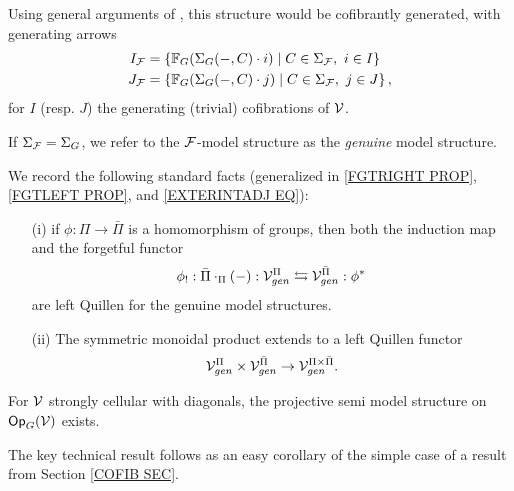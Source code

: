 \documentclass[a4paper,10pt]{article}%
\begin{document}
Using general arguments of \cite{SS00}, this structure would be cofibrantly generated, with generating arrows 
\begin{align*} 
  I_{\mathcal F} &= \left\{ \mathbb F_G(\Sigma_G(-,C) \cdot i) \;|\; C \in \Sigma_{\mathcal F},\ i\in I\right\}\\ 
  J_{\mathcal F} &= \left\{ \mathbb F_G(\Sigma_G(-,C) \cdot j) \;|\; C \in \Sigma_{\mathcal F},\ j\in J\right\}, 
\end{align*} 
for $I$ (resp. $J$) the generating (trivial) cofibrations of $\mathcal V$. 

\begin{notation} 
  If $\Sigma_{\mathcal F} = \Sigma_G$, we refer to the $\mathcal F$-model structure as the \textit{genuine} model structure. 
\end{notation} 

\begin{remark}
        \label{GENUINE_FGTRIGHT_REMARK} 
  We record the following standard facts (generalized in \ref{FGTRIGHT PROP}, \ref{FGTLEFT PROP}, and \ref{EXTERINTADJ EQ}):
  \begin{itemize}
  \item [(i)] if $\phi: \Pi \to \bar \Pi$ is a homomorphism of groups, then both the induction map and the forgetful functor 
  \[ 
  \phi_!: \bar\Pi\cdot_\Pi(-): \mathcal V^\Pi_{gen} \leftrightarrows \mathcal V^{\bar \Pi}_{gen}: \phi^*
  \] 
  are left Quillen for the genuine model structures. 
  \item[(ii)] The symmetric monoidal product extends to a left Quillen functor
          \[
          \mathcal V^\Pi_{gen} \times \mathcal V^{\bar \Pi}_{gen} \to \mathcal V^{\Pi \times \bar\Pi}_{gen}.
          \]
  \end{itemize}
\end{remark} 

\begin{theorem}\label{OP_G_SEMI_MODEL_THM} 
  For $\mathcal V$ strongly cellular with diagonals, the projective semi model structure on $\mathsf{Op}_G(\mathcal V)$ exists.
\end{theorem} 

The key technical result follows as an easy corollary of the simple case of a result from Section \ref{COFIB SEC}.
\end{document}
